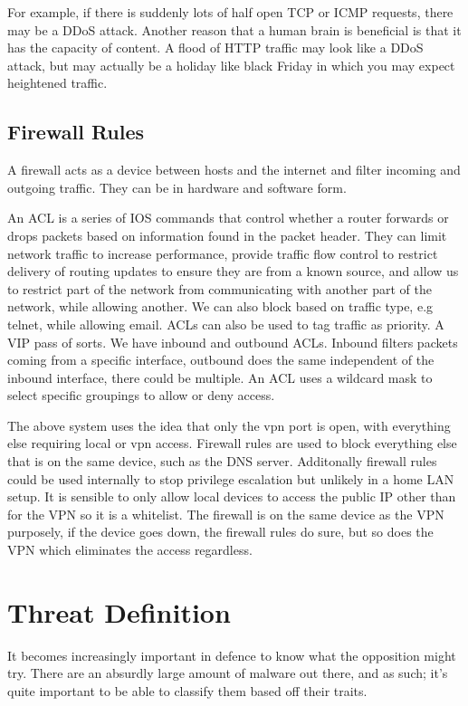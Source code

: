 For example, if there is suddenly lots of half open TCP or ICMP requests, there may be a DDoS attack. Another reason that a human brain is beneficial is that it has the capacity of content. A flood of HTTP traffic may look like a DDoS attack, 
but may actually be a holiday like black Friday in which you may expect heightened traffic.

\subsection{Firewall Rules}
A firewall acts as a device between hosts and the internet and filter incoming and outgoing traffic. They can be in hardware and software form.

An ACL is a series of IOS commands that control whether a router forwards or drops packets based on information found in the packet header. They can limit network traffic to increase performance, provide traffic flow control to restrict delivery of routing updates to 
ensure they are from a known source, and allow us to restrict part of the network from communicating with another part of the network, while allowing another. We can also block based on traffic type, e.g telnet, while allowing email. ACLs can also be used to tag traffic as priority. 
A VIP pass of sorts. We have inbound and outbound ACLs. Inbound filters packets coming from a specific interface, outbound does the same independent of the inbound interface, there could be multiple. An ACL uses a wildcard mask to select specific groupings to allow or deny access.

The above system uses the idea that only the vpn port is open, with everything else requiring local or vpn access. Firewall rules are used to block everything else that is on the same device, such as the DNS server. Additonally firewall rules could be used internally to stop privilege escalation 
but unlikely in a home LAN setup. It is sensible to only allow local devices to access the public IP other than for the VPN so it is a whitelist. The firewall is on the same device as the VPN purposely, if the device goes down, the firewall rules do sure, but so does the VPN which eliminates the access regardless.


\section{Threat Definition}
It becomes increasingly important in defence to know what the opposition might try. There are an absurdly large amount of malware out there, and as such; it's quite important to be able to classify them based off their traits.

